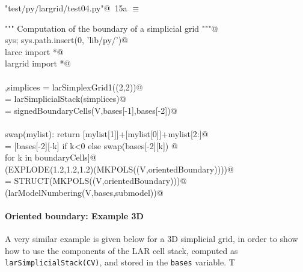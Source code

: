\documentclass[11pt,oneside]{article}	%
\begin{document}
\begin{flushleft} \small \label{scrap21}
\protect{}\verb@"test/py/largrid/test04.py"@\nobreak\ {\footnotesize 15a }$\equiv$
\vspace{-1ex}
\begin{list}{}{} \item
\mbox{}\verb@""" Computation of the boundary of a simplicial grid """@\\
\mbox{}\verb@import sys; sys.path.insert(0, 'lib/py/')@\\
\mbox{}\verb@from larcc import *@\\
\mbox{}\verb@from largrid import *@\\
\mbox{}\verb@@\\
\mbox{}\verb@V,simplices = larSimplexGrid1((2,2))@\\
\mbox{}\verb@bases = larSimplicialStack(simplices)@\\
\mbox{}\verb@boundaryCells = signedBoundaryCells(V,bases[-1],bases[-2])@\\
\mbox{}\verb@@\\
\mbox{}\verb@def swap(mylist): return [mylist[1]]+[mylist[0]]+mylist[2:]@\\
\mbox{}\verb@orientedBoundary = [bases[-2][-k] if k<0 else swap(bases[-2][k]) @\\
\mbox{}\verb@                  for k in boundaryCells]@\\
\mbox{}\verb@VIEW(EXPLODE(1.2,1.2,1.2)(MKPOLS((V,orientedBoundary))))@\\
\mbox{}\verb@submodel = STRUCT(MKPOLS((V,orientedBoundary)))@\\
\mbox{}\verb@VIEW(larModelNumbering(V,bases,submodel))@\\
\mbox{}\verb@@{\NWsep}
\end{list}
\vspace{-2ex}
\end{flushleft}


\paragraph{Oriented boundary: Example 3D}
A very similar example is given below for a 3D simplicial grid, in order to show 
how to use the components of the LAR cell stack, computed as \texttt{larSimplicialStack(CV)}, and stored in the \texttt{bases} variable. T
\end{document}
